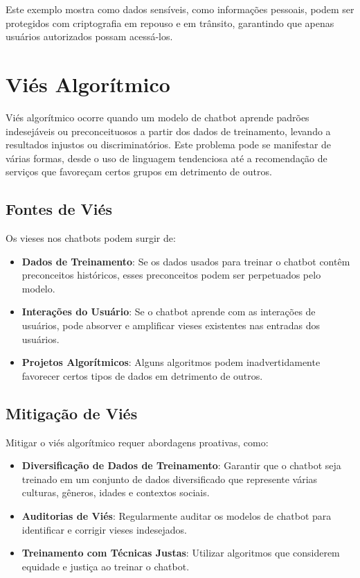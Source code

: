 \documentclass[14pt,a4paper,oneside]{book}
\begin{document}
Este exemplo mostra como dados sensíveis, como informações pessoais, podem ser protegidos com criptografia em repouso e em trânsito, garantindo que apenas usuários autorizados possam acessá-los.

\section{Viés Algorítmico}

Viés algorítmico ocorre quando um modelo de chatbot aprende padrões indesejáveis ou preconceituosos a partir dos dados de treinamento, levando a resultados injustos ou discriminatórios. Este problema pode se manifestar de várias formas, desde o uso de linguagem tendenciosa até a recomendação de serviços que favoreçam certos grupos em detrimento de outros.

\subsection{Fontes de Viés}

Os vieses nos chatbots podem surgir de:

\begin{itemize}
	\item \textbf{Dados de Treinamento}: Se os dados usados para treinar o chatbot contêm preconceitos históricos, esses preconceitos podem ser perpetuados pelo modelo.
	\item \textbf{Interações do Usuário}: Se o chatbot aprende com as interações de usuários, pode absorver e amplificar vieses existentes nas entradas dos usuários.
	\item \textbf{Projetos Algorítmicos}: Alguns algoritmos podem inadvertidamente favorecer certos tipos de dados em detrimento de outros.
\end{itemize}

\subsection{Mitigação de Viés}

Mitigar o viés algorítmico requer abordagens proativas, como:

\begin{itemize}
	\item \textbf{Diversificação de Dados de Treinamento}: Garantir que o chatbot seja treinado em um conjunto de dados diversificado que represente várias culturas, gêneros, idades e contextos sociais.
	\item \textbf{Auditorias de Viés}: Regularmente auditar os modelos de chatbot para identificar e corrigir vieses indesejados.
	\item \textbf{Treinamento com Técnicas Justas}: Utilizar algoritmos que considerem equidade e justiça ao treinar o chatbot.
\end{itemize}
\end{document}
